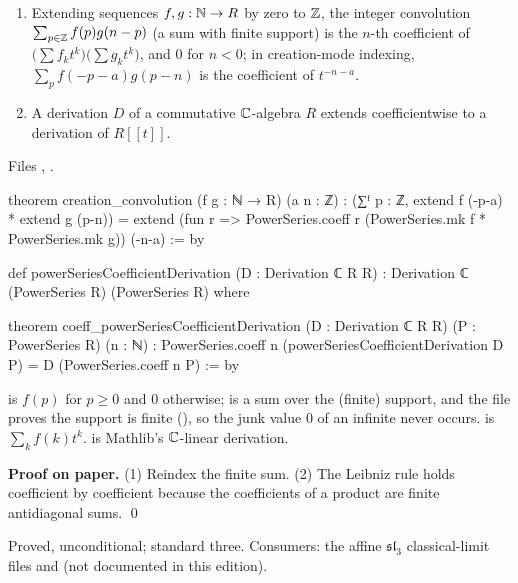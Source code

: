 \begin{theorem}\label{l11:thm:jetconv}
\begin{enumerate}
\item Extending sequences $f,g:{\mathbb{N}}\to R$ by zero to ${\mathbb{Z}}$, the integer convolution $\sum_{p\in{\mathbb{Z}}}f(p)g(n-p)$ (a sum with
  finite support) is the $n$-th coefficient of $\bigl(\sum f_kt^k\bigr)\bigl(\sum g_kt^k\bigr)$, and $0$ for $n<0$; in
  creation-mode indexing, $\sum_pf(-p-a)g(p-n)$ is the coefficient of $t^{-n-a}$.
\item A derivation $D$ of a commutative ${\mathbb{C}}$-algebra $R$ extends coefficientwise to a derivation of $R[[t]]$.
\end{enumerate}
\end{theorem}
\noindent Files ,
.
\begin{leancode}
theorem creation_convolution (f g : ℕ → R) (a n : ℤ) :
    (∑ᶠ p : ℤ, extend f (-p-a) * extend g (p-n)) =
      extend (fun r => PowerSeries.coeff r (PowerSeries.mk f * PowerSeries.mk g)) (-n-a) := by

def powerSeriesCoefficientDerivation (D : Derivation ℂ R R) :
    Derivation ℂ (PowerSeries R) (PowerSeries R) where

theorem coeff_powerSeriesCoefficientDerivation (D : Derivation ℂ R R)
    (P : PowerSeries R) (n : ℕ) :
    PowerSeries.coeff n (powerSeriesCoefficientDerivation D P) = D (PowerSeries.coeff n P) := by
\end{leancode}

\begin{dictionary}
 is $f(p)$ for $p\ge0$ and $0$ otherwise;  is a sum over the (finite) support, and the file
proves the support is finite (), so the junk value $0$ of an infinite  never
occurs.  is $\sum_kf(k)t^k$.  is Mathlib's ${\mathbb{C}}$-linear derivation.
\end{dictionary}

\textbf{Proof on paper.} (1) Reindex the finite sum. (2) The Leibniz rule holds coefficient by coefficient because
the coefficients of a product are finite antidiagonal sums. \qed

\begin{status}
Proved, unconditional; standard three. Consumers: the affine $\mathfrak{sl}_3$ classical-limit files 
and  (not documented in this edition).
\end{status}

